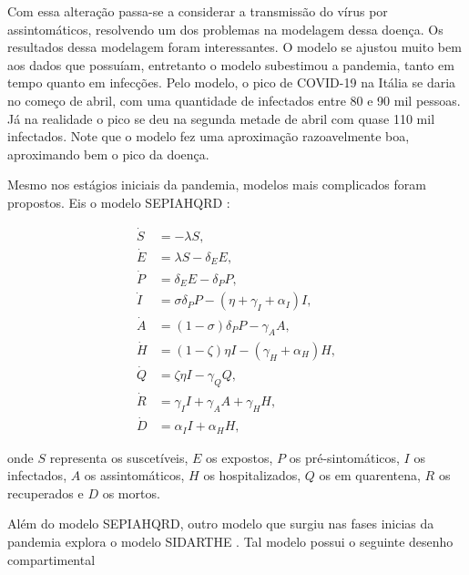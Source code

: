 \documentclass{article}
\begin{document}
Com essa alteração passa-se a considerar a transmissão do vírus por assintomáticos, resolvendo um dos problemas na modelagem dessa doença. Os resultados dessa modelagem foram interessantes. O modelo se ajustou muito bem aos dados que possuíam, entretanto o modelo subestimou a pandemia, tanto em tempo quanto em infecções. Pelo modelo, o pico de COVID-19 na Itália se daria no começo de abril, com uma quantidade de infectados entre 80 e 90 mil pessoas. Já na realidade o pico se deu na segunda metade de abril com quase 110 mil infectados. Note que o modelo fez uma aproximação razoavelmente boa, aproximando bem o pico da doença.

Mesmo nos estágios iniciais da pandemia, modelos mais complicados foram propostos. Eis o modelo SEPIAHQRD \cite{Gatto10484}:

\begin{equation*}
    \begin{split}
        \dot{S} & = -\lambda S,\\
        \dot{E} & = \lambda S - \delta_E E, \\
        \dot{P} & = \delta_E E - \delta_P P, \\
        \dot{I} & = \sigma \delta_P P - (\eta + \gamma_I + \alpha_I) I, \\
        \dot{A} & = (1-\sigma) \delta_P P - \gamma_A A, \\
        \dot{H} & = (1-\zeta) \eta I - (\gamma_H + \alpha_H) H, \\
        \dot{Q} & = \zeta \eta I - \gamma_Q Q, \\
        \dot{R} & = \gamma_I I + \gamma_A A + \gamma_H H, \\
        \dot{D} & = \alpha_I I + \alpha_H H,
    \end{split}
\end{equation*}

\noindent onde $S$ representa os suscetíveis, $E$ os expostos, $P$ os pré-sintomáticos, $I$ os infectados, $A$ os assintomáticos, $H$ os hospitalizados, $Q$ os em quarentena, $R$ os recuperados e $D$ os mortos. 


Além do modelo SEPIAHQRD, outro modelo que surgiu nas fases inicias da pandemia explora o modelo SIDARTHE \cite{JOUR}. Tal modelo possui o seguinte desenho compartimental
\end{document}
